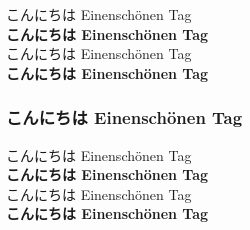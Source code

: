 \documentclass[a4paper,titlepage,draft\@landscape@]{\class}
\newif\ifdeluxemode\deluxemodefalse
\begin{document}
\ifdeluxemode
{\mcfamily\ltseries
\UTFC{4F60}\UTFC{597D} \UTFT{60A8}\UTFT{597D} \UTFK{C548}\UTFK{B155} %
こんにちは Einenschönen Tag\\
}%
\fi%
{\mcfamily
{}   %
こんにちは Einenschönen Tag\\
}%
{\mcfamily\bfseries
{}   %
こんにちは Einenschönen Tag\\
}%
{\gtfamily
{}   %
こんにちは Einenschönen Tag\\
}%
{\gtfamily\bfseries
{}   %
こんにちは Einenschönen Tag\\
}%
\ifdeluxemode
{\gtfamily\ebseries
\UTFC{4F60}\UTFC{597D} \UTFT{60A8}\UTFT{597D} \UTFK{C548}\UTFK{B155} %
こんにちは Einenschönen Tag\\
}%
{\mgfamily
\UTFC{4F60}\UTFC{597D} \UTFT{60A8}\UTFT{597D} \UTFK{C548}\UTFK{B155} %
こんにちは Einenschönen Tag\\
}%
\fi%

\subsubsection{   こんにちは Einenschönen Tag}

{\footnotesize
\ifdeluxemode
{\mcfamily\ltseries
\UTFC{4F60}\UTFC{597D} \UTFT{60A8}\UTFT{597D} \UTFK{C548}\UTFK{B155} %
こんにちは Einenschönen Tag\\
}%
\fi%
{\mcfamily
{}   %
こんにちは Einenschönen Tag\\
}%
{\mcfamily\bfseries
{}   %
こんにちは Einenschönen Tag\\
}%
{\gtfamily
{}   %
こんにちは Einenschönen Tag\\
}%
{\gtfamily\bfseries
{}   %
こんにちは Einenschönen Tag\\
}%
\ifdeluxemode
{\gtfamily\ebseries
\UTFC{4F60}\UTFC{597D} \UTFT{60A8}\UTFT{597D} \UTFK{C548}\UTFK{B155} %
こんにちは Einenschönen Tag\\
}%
{\mgfamily
\UTFC{4F60}\UTFC{597D} \UTFT{60A8}\UTFT{597D} \UTFK{C548}\UTFK{B155} %
こんにちは Einenschönen Tag\\
}%
\fi%
}
\end{document}
